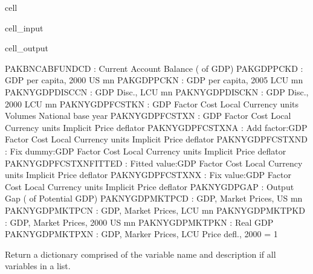 \documentclass[letterpaper,10pt,english]{jupyterBook}
\begin{document}
\begin{sphinxuseclass}{cell}\begin{sphinxVerbatimInput}

\begin{sphinxuseclass}{cell_input}
\begin{sphinxVerbatim}[commandchars=\\\{\}]
\PYG{p}{[}\PYG{p}{]}
\end{sphinxVerbatim}

\end{sphinxuseclass}\end{sphinxVerbatimInput}
\begin{sphinxVerbatimOutput}

\begin{sphinxuseclass}{cell_output}
\begin{sphinxVerbatim}[commandchars=\\\{\}]
PAKBNCABFUNDCD\PYGZus{}       : Current Account Balance (\PYGZpc{} of GDP)
PAKGDPPCKD            : GDP per capita, 2000 US\PYGZdl{} mn
PAKGDPPCKN            : GDP per capita, 2005 LCU mn
PAKNYGDPDISCCN        : GDP Disc., LCU mn
PAKNYGDPDISCKN        : GDP Disc., 2000 LCU mn
PAKNYGDPFCSTKN        : GDP Factor Cost Local Currency units Volumes National base year
PAKNYGDPFCSTXN        : GDP Factor Cost Local Currency units Implicit Price deflator
PAKNYGDPFCSTXN\PYGZus{}A      : Add factor:GDP Factor Cost Local Currency units Implicit Price deflator
PAKNYGDPFCSTXN\PYGZus{}D      : Fix dummy:GDP Factor Cost Local Currency units Implicit Price deflator
PAKNYGDPFCSTXN\PYGZus{}FITTED : Fitted  value:GDP Factor Cost Local Currency units Implicit Price deflator
PAKNYGDPFCSTXN\PYGZus{}X      : Fix value:GDP Factor Cost Local Currency units Implicit Price deflator
PAKNYGDPGAP\PYGZus{}          : Output Gap (\PYGZpc{} of Potential GDP)
PAKNYGDPMKTPCD        : GDP, Market Prices, US\PYGZdl{} mn
PAKNYGDPMKTPCN        : GDP, Market Prices, LCU mn
PAKNYGDPMKTPKD        : GDP, Market Prices, 2000 US\PYGZdl{} mn
PAKNYGDPMKTPKN        : Real GDP
PAKNYGDPMKTPXN        : GDP, Marker Prices, LCU Price defl., 2000 = 1
\end{sphinxVerbatim}

\end{sphinxuseclass}\end{sphinxVerbatimOutput}

\end{sphinxuseclass}
\sphinxAtStartPar
Return a dictionary comprised of the variable name and description if all variables in a list.
\end{document}
